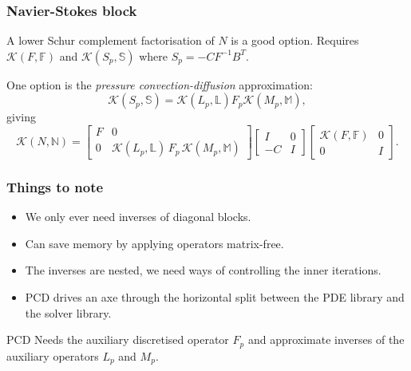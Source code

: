 \documentclass[presentation]{beamer}
\newcommand{\KSP}[2]{\ensuremath{\mathcal{K}\left(#1, \mathbb{#2}\right)}}
\newcommand{\ksp}[1]{\KSP{#1}{#1}}
\begin{document}
\begin{frame}
  \frametitle{Navier-Stokes block \parencite{Elman:2014}}
  A lower Schur complement factorisation of $N$ is a good option.
  Requires $\ksp{F}$ and $\KSP{S_p}{S}$ where $S_p = -C F^{-1} B^T$.

  One option is the \emph{pressure convection-diffusion}
  approximation:
  \begin{equation*}
    \KSP{S_p}{S} = \KSP{L_p}{L} F_p \KSP{M_p}{M},
  \end{equation*}
  giving
  \begin{equation*}
    \ksp{N} = \begin{bmatrix}
      F & 0 \\
      0 & \KSP{L_p}{L}\,F_p \, \KSP{M_p}{M}
    \end{bmatrix}
    \begin{bmatrix}
      I & 0\\
      -C & I
    \end{bmatrix}
    \begin{bmatrix}
      \ksp{F} & 0 \\
      0 & I
    \end{bmatrix}.
  \end{equation*}

\end{frame}

\begin{frame}
  \frametitle{Things to note}

  \begin{itemize}
  \item We only ever need inverses of diagonal blocks.
  \item Can save memory by applying operators matrix-free.
  \item The inverses are nested, we need ways of controlling the inner
    iterations.
  \item PCD drives an axe through the horizontal split between
    the PDE library and the solver library.
  \end{itemize}

  \begin{block}{PCD}
    Needs the auxiliary discretised operator $F_p$ and approximate
    inverses of the auxiliary operators $L_p$ and $M_p$.
  \end{block}
\end{frame}
\end{document}
